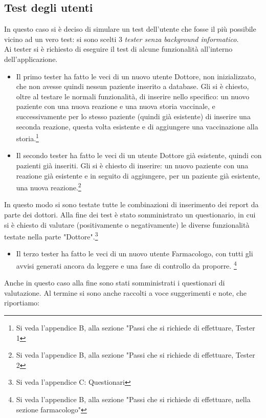 \documentclass[11pt]{article}
\begin{document}
    \newpage
        \subsection{Test degli utenti}
        In questo caso si è deciso di simulare un test dell'utente che fosse il più possibile vicino ad un vero test: si sono scelti 3 \textit{tester senza background informatico}.\\
        Ai tester si è richiesto di eseguire il test di alcune funzionalità all'interno dell'applicazione.
            \begin{itemize}
                \item Il primo tester ha fatto le veci di un nuovo utente Dottore, non inizializzato, che non avesse quindi nessun paziente inserito a database. Gli si è chiesto, oltre al testare le normali funzionalità, di inserire nello specifico: un nuovo paziente con una nuova reazione e una nuova storia vaccinale, e successivamente per lo stesso paziente (quindi già esistente)
                di inserire una seconda reazione, questa volta esistente e di aggiungere una vaccinazione alla storia.\footnote{Si veda l'appendice B, alla sezione "Passi che si richiede di effettuare, Tester 1}
                \item Il secondo tester ha fatto le veci di un utente Dottore già esistente, quindi con pazienti già inseriti. Gli si è chiesto di inserire: un nuovo paziente con una reazione già esistente e in seguito di aggiungere, per un paziente già esistente, una nuova reazione.\footnote{Si veda l'appendice B, alla sezione "Passi che si richiede di effettuare, Tester 2}
            \end{itemize}
        In questo modo si sono testate tutte le combinazioni di inserimento dei report da parte dei dottori. Alla fine dei test è stato somministrato un questionario, in cui si è chiesto di valutare (positivamente o negativamente) le diverse funzionalità testate nella parte "Dottore".\footnote{Si veda l'appendice C: Questionari}
            \begin{itemize}
                \item Il terzo tester ha fatto le veci di un nuovo utente Farmacologo, con tutti gli avvisi generati ancora da leggere e una fase di controllo da proporre. \footnote{Si veda l'appendice B, alla sezione "Passi che si richiede di effettuare, nella sezione farmacologo"}
            \end{itemize}
        Anche in questo caso alla fine sono stati somministrati i questionari di valutazione.
    Al termine si sono anche raccolti a voce suggerimenti e note, che riportiamo: 
\end{document}
